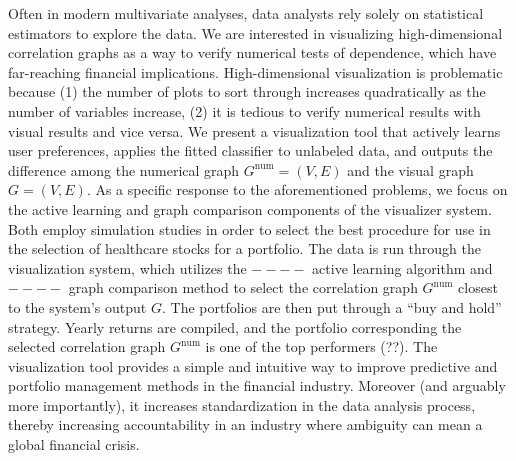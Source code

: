 Often in modern multivariate analyses, data analysts rely solely on statistical
estimators to explore the data. We are interested in visualizing 
high-dimensional correlation graphs as a way to verify numerical tests of 
dependence, which have far-reaching financial implications. High-dimensional 
visualization is problematic because (1) the number of plots to sort through 
increases quadratically as the number of variables increase, (2) it is tedious 
to verify numerical results with visual results and vice versa. We 
present a visualization tool that actively learns user preferences, applies 
the fitted classifier to unlabeled data, and outputs the difference among the 
numerical graph $G^{\text{num}}=(V,E)$ and the visual graph $G=(V,E)$. 
As a specific response to the aforementioned problems, we focus on the active 
learning and graph comparison components of the visualizer system. Both employ 
simulation studies in order to select the best procedure for use in the 
selection of healthcare stocks for a portfolio. The data is run through the 
visualization system, which utilizes the $----$ active learning 
algorithm and $----$ graph comparison method to select the correlation graph 
$G^{\text{num}}$ closest to the system's output $G$. The portfolios 
are then put through a ``buy and hold'' strategy. Yearly returns are compiled, 
and the portfolio corresponding the selected correlation graph $G^{\text{num}}$ 
is one of the top performers (??). The visualization tool provides a simple and 
intuitive way to improve predictive and portfolio management methods in the 
financial industry. Moreover (and arguably more importantly), it increases 
standardization in the data analysis process, thereby increasing accountability 
in an industry where ambiguity can mean a global financial crisis.
